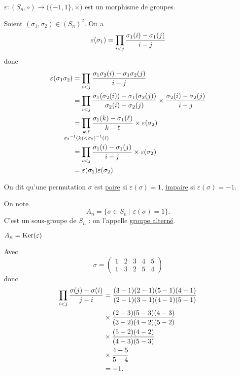 \begin{thm}
	$\varepsilon: (S_n, \circ) \to \big(\{-1,1\}, \times\big)$ est un morphisme de groupes.
\end{thm}

\begin{prv}
	Soient $(\sigma_1, \sigma_2) \in (S_n)^2$. On a \[
		\varepsilon(\sigma_1) = \prod_{i<j} \frac{\sigma_1(i) - \sigma_1(j)}{i - j}\\
	\] donc
	\begin{align*}
		\varepsilon(\sigma_1\sigma_2) &= \prod_{i<j} \frac{\sigma_1\sigma_2(i) - \sigma_1\sigma_2(j)}{i-j}\\
		&= \prod_{i<j}\frac{\sigma_1(\sigma_2(i)) - \sigma_1(\sigma_2(j))}{\sigma_2(i) - \sigma_2(j)} \times \frac{\sigma_2(i) - \sigma_2(j)}{i-j} \\
		&= \prod_{\mathclap{\substack{k,\ell\\{\sigma_2}^{-1}(k) < {\sigma_2)^{-1}(\ell)}}}}
		\frac{\sigma_1(k) - \sigma_1(\ell)}{k-\ell}\times \varepsilon(\sigma_2)\\
		&= \prod_{i<j}\frac{\sigma_1(i) - \sigma_1(j)}{i-j}\times \varepsilon(\sigma_2) \\
		&= \varepsilon(\sigma_1)\varepsilon(\sigma_2). \\
	\end{align*}
\end{prv}

\begin{defn}
	On dit qu'une permutation $\sigma$ est \underline{paire} si $\varepsilon(\sigma) = 1$, \underline{impaire} si $\varepsilon(\sigma) = -1$.
\end{defn}

\begin{prop-defn}
	On note \[
		A_n = \{\sigma \in S_n  \mid \varepsilon(\sigma) = 1\}.
	\]
	C'est un sous-groupe de $S_n$ : on l'appelle \underline{groupe alterné}.
\end{prop-defn}

\begin{prv}$A_n = \Ker(\varepsilon)$
\end{prv}

\begin{exm}
	Avec \[
		\sigma = \begin{pmatrix}
			1&2&3&4&5\\
			1&3&2&5&4
		\end{pmatrix}
	\] donc 
	\begin{align*}
		\prod_{i<j} \frac{\sigma(j) - \sigma(i)}{j - i}
		&= \frac{\cancel{(3-1)}\cancel{(2-1)}\cancel{(5-1)}\cancel{(4-1)}}{\cancel{(2-1)}\cancel{(3-1)}\cancel{(4-1)}\cancel{(5-1)}} \\
		&\times \frac{\cancel{(2-3)}\cancel{(5-3)}\cancel{(4-3)}}{\cancel{(3-2)}\cancel{(4-2)}\cancel{(5-2)}}\\
		&\times \frac{\cancel{(5-2)}\cancel{(4-2)}}{\cancel{(4-3)}\cancel{(5-3)}}\\
		&\times \frac{4-5}{5-4}\\
		&= -1. \\
	\end{align*}
\end{exm}


